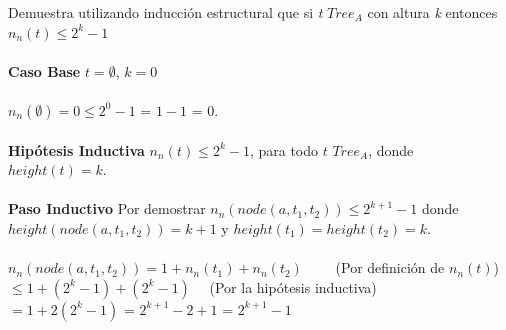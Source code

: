    \begin{exercise}
        Demuestra utilizando inducción estructural que si \textit{t} $Tree_{A}$ con altura \textit{k} entonces $n_n(t) \leq 2^k - 1$ \\\\
        \textbf{Caso Base} $t = \emptyset$, $k=0$\\\\
            $n_n(\emptyset) = 0  \leq 2^0 -1 $ = $1 -1$ = 0.\\\\
        \textbf{Hipótesis Inductiva} $n_n(t) \leq 2^k - 1$,  para todo $t$ $Tree_{A}$, donde $height(t)=k$. \\\\
        \textbf{Paso Inductivo} Por demostrar $n_n(node(a,t_1,t_2)) \leq 2^{k+1} - 1$ donde $height(node(a,t_1,t_2)) = k + 1$ y $height(t_1) = height(t_2) = k$.\\\\
            $n_n(node(a,t_1,t_2)) = 1 + n_n(t_1) + n_n(t_2)$ \quad \quad \quad \quad \quad \quad \ \ \ \  (Por definición de $n_n(t)$) \\
            $\leq 1 + (2^{k} - 1) + (2^{k} - 1)$ \qquad \qquad \qquad \qquad \qquad \qquad  \ \ (Por la hipótesis inductiva) \\
            $= 1 + 2(2^{k} - 1)$ = $2^{k+1} - 2 + 1$ = $2^{k+1} - 1$\\
    \end{exercise}

